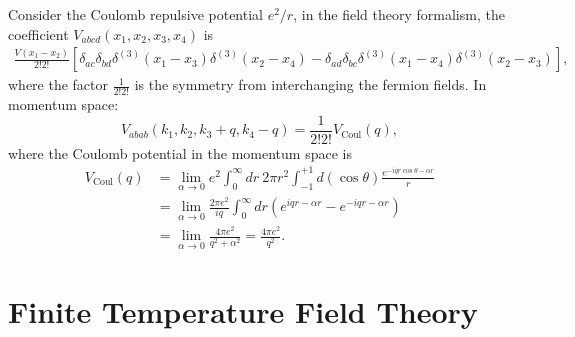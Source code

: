 Consider the Coulomb repulsive potential $e^2/r$, in the field theory formalism, the coefficient $V_{abcd}(x_1,x_2,x_3,x_4)$ is
\begin{equation}
\begin{aligned}
	\frac{V(x_1-x_2)}{2!2!}\left[\delta_{ac}\delta_{bd}\delta^{(3)}(x_1-x_3)\delta^{(3)}(x_2-x_4) - \delta_{ad}\delta_{bc}\delta^{(3)}(x_1-x_4)\delta^{(3)}(x_2-x_3)\right],
\end{aligned}
\end{equation}
where the factor $\frac{1}{2!2!}$ is the symmetry from interchanging the fermion fields.
In momentum space:
\begin{equation}
	V_{abab}(k_1,k_2,k_3+q,k_4-q) = \frac{1}{2!2!} V_{\mathrm{Coul}}(q),
\end{equation}
where the Coulomb potential in the momentum space is
\begin{equation}
\begin{aligned}
	V_{\mathrm{Coul}}(q) 
	&=  \lim_{\alpha\rightarrow0}e^{2}\int_{0}^{\infty}dr\ 2\pi r^{2} \int_{-1}^{+1}d\left(\cos\theta\right)\frac{e^{-iqr\cos\theta-\alpha r}}{r} \\
	&=  \lim_{\alpha\rightarrow0}\frac{2\pi e^{2}}{iq}\int_{0}^{\infty}dr\left(e^{iqr-\alpha r}-e^{-iqr-\alpha r}\right)\\
 	&=  \lim_{\alpha\rightarrow0}\frac{4\pi e^{2}}{q^{2}+\alpha^{2}}
	=  \frac{4\pi e^{2}}{q^{2}}.
\end{aligned}
\end{equation}



\section{Finite Temperature Field Theory}

